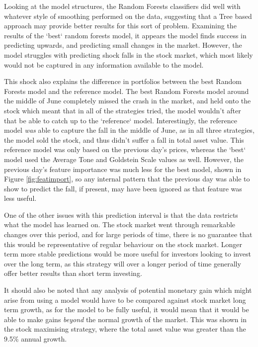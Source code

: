 Looking at the model structures, the Random Forests classifiers did well with whatever style of smoothing performed on the data, suggesting that a Tree based approach may provide better results for this sort of problem. Examining the results of the `best` random forests model, it appears the model finds success in predicting upwards, and predicting small changes in the market. However, the model struggles with predicting shock falls in the stock market, which most likely would not be captured in any information available to the model.  

This shock also explains the difference in portfolios between the best Random Forests model and the reference model. The best Random Forests model around the middle of June completely missed the crash in the market, and held onto the stock which meant that in all of the strategies tried, the model wouldn't after that be able to catch up to the `reference` model. Interestingly, the reference model \textit{was} able to capture the fall in the middle of June, as in all three strategies, the model sold the stock, and thus didn't suffer a fall in total asset value. This reference model was only based on the previous day's prices, whereas the `best` model used the Average Tone and Goldstein Scale values as well. However, the previous day's feature importance was much less for the best model, shown in Figure \ref{fig:featimport}, so any internal pattern that the previous day was able to show to predict the fall, if present, may have been ignored as that feature was less useful. 

One of the other issues with this prediction interval is that the data restricts what the model has learned on. The stock market went through remarkable changes over this period, and for large periods of time, there is no guarantee that this would be representative of regular behaviour on the stock market. Longer term more stable predictions would be more useful for investors looking to invest over the long term, as this strategy will over a longer period of time generally offer better results than short term investing.

It should also be noted that any analysis of potential monetary gain which might arise from using a model would have to be compared against stock market long term growth, as for the model to be fully useful, it would mean that it would be able to make gains \textit{beyond} the normal growth of the market. This was shown in the stock maximising strategy, where the total asset value was greater than the 9.5\% annual growth. 





